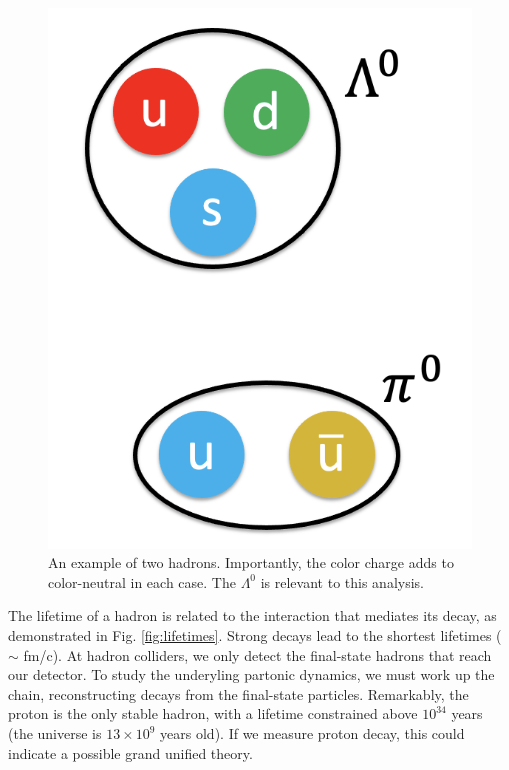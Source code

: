 \documentclass[../main.tex]{subfiles}
\begin{document}
\begin{figure}[h]
    \centering
    \includegraphics[scale=0.2]{introduction/figs/hadrons.png}
    \caption{An example of two hadrons. Importantly, the color charge adds to color-neutral in each case. The $\Lambda^0$ is relevant to this analysis.}
    \label{fig:enter-label}
\end{figure}

The lifetime of a hadron is related to the interaction that mediates its decay, as demonstrated in Fig. \ref{fig:lifetimes}. Strong decays lead to the shortest lifetimes ($\sim$ fm/c). At hadron colliders, we only detect the final-state hadrons that reach our detector. 
To study the underyling partonic dynamics, we must work up the chain, reconstructing decays from the final-state particles. Remarkably, the proton is the only stable hadron, with a lifetime constrained above $10^{34}$ years (the universe is $13\times10^9$ years old). If we measure proton decay, this could indicate a possible grand unified theory. 
\end{document}
